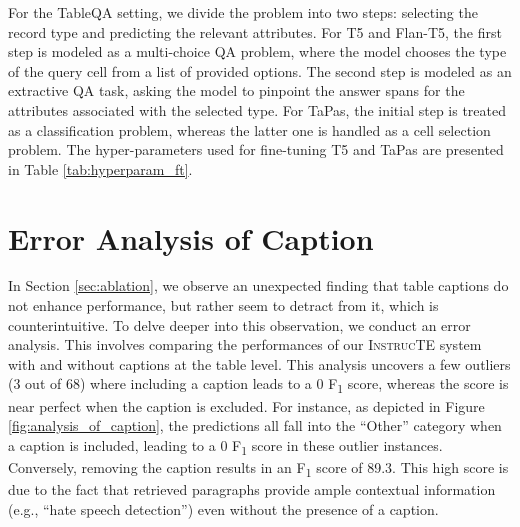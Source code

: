 \documentclass[11pt]{article}
\begin{document}
For the TableQA setting, we divide the problem into two steps: selecting the record type and predicting the relevant attributes. For T5 and Flan-T5, the first step is modeled as a multi-choice QA problem, where the model chooses the type of the query cell from a list of provided options. The second step is modeled as an extractive QA task, asking the model to pinpoint the answer spans for the attributes associated with the selected type. For TaPas, the initial step is treated as a classification problem, whereas the latter one is handled as a cell selection problem. The hyper-parameters used for fine-tuning T5 and TaPas are presented in Table \ref{tab:hyperparam_ft}.

\begin{table}[t]
\centering
{}
\caption{Hyper-parameters used for fine-tuning T5 and TaPas.
}
\label{tab:hyperparam_ft}
\end{table}


\section{Error Analysis of Caption}
\label{sec:error_analysis_of_caption}

In Section \ref{sec:ablation}, we observe an unexpected finding that table captions do not enhance performance, but rather seem to detract from it, which is counterintuitive. To delve deeper into this observation, we conduct an error analysis. This involves comparing the performances of our \textsc{InstrucTE} system with and without captions at the table level. This analysis uncovers a few outliers (3 out of 68) where including a caption leads to a 0 F\textsubscript{1} score, whereas the score is near perfect when the caption is excluded.
For instance, as depicted in Figure \ref{fig:analysis_of_caption}, the predictions all fall into the ``Other'' category when a caption is included, leading to a 0 F\textsubscript{1} score in these outlier instances. Conversely, removing the caption results in an F\textsubscript{1} score of 89.3. This high score is due to the fact that retrieved paragraphs provide ample contextual information (e.g., ``hate speech detection'') even without the presence of a caption.
\end{document}
